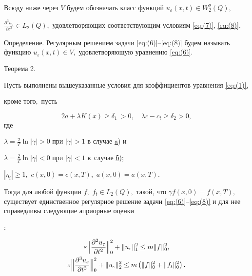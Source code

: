 Всюду ниже через $V$ будем обозначать класс функций ${{u}_{\varepsilon }}(x,t)\in W_{2}^{2}(Q)$, 

$\frac{{{\partial }^{3}}{{u}_{\varepsilon }}}{\partial {{t}^{3}}}\in {{L}_{2}}(Q),$ удовлетворяющих     соответствующим     условиям  \eqref{eq:(7)}, \eqref{eq:(8)}.



\smallskip



{\small \sc Определение.} Регулярным решением задачи \eqref{eq:(6)}--\eqref{eq:(8)}  будем называть функцию ${{u}_{\varepsilon }}(x,t)\in V,$ удовлетворяющую уравнению \eqref{eq:(6)}.



\smallskip





\hypertarget{dzh:th2}{}



{\small\sc Теорема 2.}

{\it 

Пусть выполнены вышеуказанные условия для коэффициентов уравнения {\rm \eqref{eq:(1)},} 

кроме того$,$ пусть 

$$

2a+\lambda K(x)\ge \delta _{1}\ >0,\quad  

\lambda  c-{{c}_{t}}\ge {{\delta }_{2}}>0,

$$ где  

$\lambda =\frac{2}{T}\ln | \gamma  |>0$ при $| \gamma |>1$ в случае {\rm \hyperlink{dzh:a}{a})} и 

$\lambda =\frac{2}{T}\ln | \gamma  |<0$ при $| \gamma |<1$ в~случае {\rm \hyperlink{dzh:b}{б});}  

$| \eta _i |\ge 1,$ $ c(x,0)=c(x,T),$ $a (x,0)=a(x,T).$

 Тогда для любой функции  $f,$ ${{f}_{t}}\in {{L}_{2}}(Q),$ такой, что $ \gamma  f(x,0)=f(x,T),$ существует единственное  регулярное решение задачи \eqref{eq:(6)}--\eqref{eq:(8)} и для нее справедливы следующие априорные оценки}\/:

\begin{gather}

\label{eq:I)}

\varepsilon \Bigl\| \frac{{{\partial }^{2}}{{u}_{\varepsilon }}}{\partial {{t}^{2}}} \Bigr\|_{0}^{2}+

\| {u_\varepsilon } \|_{1}^{2}\le m \| f \|_{0}^{2},

\\

\label{eq:II)}

\varepsilon \Bigl\| \frac{{{\partial }^{3}}{{u}_{\varepsilon }}}{\partial {{t}^{3}}} \Bigr\|_{0}^{2}+

\| {{u}_{\varepsilon }} \|_{2}^{2}\le m\left( \| f \|_{0}^{2}+\| {{f}_{t}} \|_{0}^{2} \right).

\end{gather}







